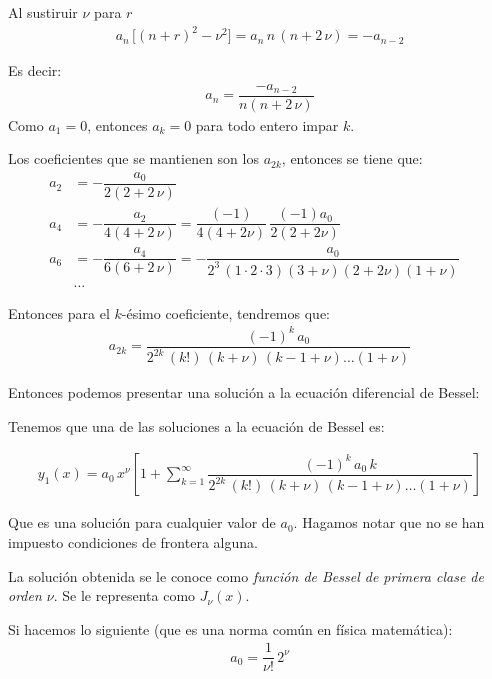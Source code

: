 Al sustiruir $\nu$ para $r$
\begin{align*}
a_{n} \, \big[ (n + r)^{2} - \nu^{2} \big] = a_{n} \, n \, (n + 2 \, \nu) = - a_{n-2}
\end{align*}

Es decir:
\begin{align*}
a_{n} = \dfrac{- a_{n-2}}{n (n + 2 \, \nu)}
\end{align*}
Como $a_{1} = 0$, entonces $a_{k} = 0$ para todo entero impar $k$.

Los coeficientes que se mantienen son los $a_{2 k}$, entonces se tiene que:
\begin{align*}
a_{2} &= - \dfrac{a_{0}}{2 (2 + 2 \, \nu)} \\[0.5em]
a_{4} &= - \dfrac{a_{2}}{4 (4 + 2 \, \nu)} = \dfrac{(-1)}{4 (4 + 2 \nu)} \, \dfrac{(-1)a_{0}}{2 (2 + 2 \nu)} \\[0.5em]
a_{6} &= - \dfrac{a_{4}}{6 (6 + 2 \, \nu)} = - \dfrac{a_{0}}{2^{3} \, (1 \cdot 2 \cdot 3) (3 + \nu)(2 + 2 \nu)(1 + \nu)}\\
&\ldots&
\end{align*}

Entonces para el $k$-ésimo coeficiente, tendremos que:
\begin{align*}
a_{2k} = \dfrac{(-1)^{k} \, a_{0}}{2^{2 k} \, (k!) \, (k + \nu) \, (k - 1 + \nu) \ldots (1 + \nu)}
\end{align*}

Entonces podemos presentar una solución a la ecuación diferencial de Bessel:

Tenemos que una de las soluciones a la ecuación de Bessel es:

\begin{align*}
y_{1}(x) = a_{0} \, x^{\nu} \left[ 1 + \sum_{k=1}^{\infty} \dfrac{(-1)^{k} \, a_{0} \, k}{2^{2 k} \, (k!) \, (k + \nu) \, (k -1 + \nu)\ldots (1 + \nu)} \right]
\end{align*}

Que es una solución para cualquier valor de $a_{0}$. Hagamos notar que no se han impuesto condiciones de frontera alguna.

La solución obtenida se le conoce como \emph{función de Bessel de primera clase de orden $\nu$}. Se le representa como $J_{\nu} (x)$.

Si hacemos lo siguiente (que es una norma común en física matemática):
\begin{align*}
a_{0} = \dfrac{1}{\nu!} \, 2^{\nu}
\end{align*}

